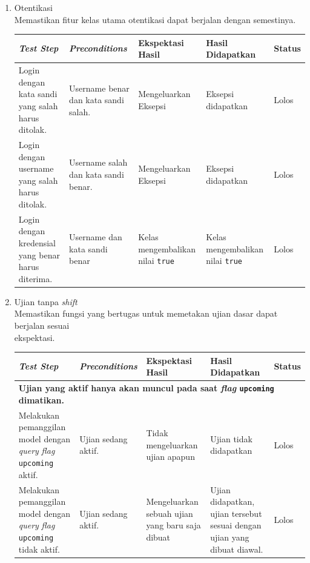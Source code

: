 \begin{enumerate}
    \item Otentikasi\\
        Memastikan fitur kelas utama otentikasi dapat berjalan dengan semestinya.\\
        \begin{longtable}{|p{}|p{}|p{}|p{}|p{}|}
            \hline
            \textit{Test Step} & \textit{Preconditions} & Ekspektasi Hasil & Hasil Didapatkan & Status  \\
            \hline
            \endhead
            Login dengan kata sandi yang salah harus ditolak. & Username benar dan kata sandi salah. & Mengeluarkan Eksepsi & Eksepsi didapatkan & Lolos \\
            \hline
            Login dengan username yang salah harus ditolak. & Username salah dan kata sandi benar. & Mengeluarkan Eksepsi & Eksepsi didapatkan & Lolos \\
            \hline
            Login dengan kredensial yang benar harus diterima. & Username dan kata sandi benar & Kelas mengembalikan nilai \texttt{true} & Kelas mengembalikan nilai \texttt{true} & Lolos \\
            \hline
        \end{longtable}
        
    \item Ujian tanpa \textit{shift}\\
        Memastikan fungsi yang bertugas untuk memetakan ujian dasar dapat berjalan sesuai \\ ekspektasi.\\
         \begin{longtable}{|p{}|p{}|p{}|p{}|p{}|}
            \hline
            \textit{Test Step} & \textit{Preconditions} & Ekspektasi Hasil & Hasil Didapatkan & Status  \\
            \hline
            \endhead
            
            \multicolumn{5}{|l|}{\textbf{Ujian yang aktif hanya akan muncul pada saat \textit{flag} \texttt{upcoming} dimatikan.}}\\
            \hline
            Melakukan pemanggilan model dengan \textit{query} \textit{flag} \texttt{upcoming} aktif. &
            Ujian sedang aktif. & Tidak mengeluarkan ujian apapun & Ujian tidak didapatkan & Lolos \\
            \hline
            Melakukan pemanggilan model dengan \textit{query} \textit{flag} \texttt{upcoming} tidak aktif. &
            Ujian sedang aktif. & Mengeluarkan sebuah ujian yang baru saja dibuat & 
            Ujian didapatkan, ujian tersebut sesuai dengan ujian yang dibuat diawal. & Lolos \\
            \hline
            

\end{longtable}
\end{enumerate}

